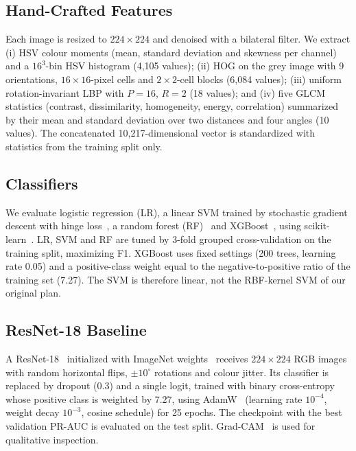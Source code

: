 \documentclass[conference]{IEEEtran}
\begin{document}
\subsection{Hand-Crafted Features}
Each image is resized to $224\times224$ and denoised with a bilateral filter. We extract (i) HSV colour moments (mean, standard deviation and skewness per channel) and a $16^3$-bin HSV histogram (4,105 values); (ii) HOG on the grey image with 9 orientations, $16\times16$-pixel cells and $2\times2$-cell blocks (6,084 values); (iii) uniform rotation-invariant LBP with $P{=}16$, $R{=}2$ (18 values); and (iv) five GLCM statistics (contrast, dissimilarity, homogeneity, energy, correlation) summarized by their mean and standard deviation over two distances and four angles (10 values). The concatenated 10,217-dimensional vector is standardized with statistics from the training split only.

\subsection{Classifiers}
We evaluate logistic regression (LR), a linear SVM trained by stochastic gradient descent with hinge loss~\cite{cortes1995svm}, a random forest (RF)~\cite{breiman2001random} and XGBoost~\cite{chen2016xgboost}, using scikit-learn~\cite{pedregosa2011scikit}. LR, SVM and RF are tuned by 3-fold grouped cross-validation on the training split, maximizing F1. XGBoost uses fixed settings (200 trees, learning rate 0.05) and a positive-class weight equal to the negative-to-positive ratio of the training set (7.27). The SVM is therefore linear, not the RBF-kernel SVM of our original plan.

\subsection{ResNet-18 Baseline}
A ResNet-18~\cite{he2016resnet} initialized with ImageNet weights~\cite{deng2009imagenet} receives $224\times224$ RGB images with random horizontal flips, $\pm10^\circ$ rotations and colour jitter. Its classifier is replaced by dropout (0.3) and a single logit, trained with binary cross-entropy whose positive class is weighted by 7.27, using AdamW~\cite{loshchilov2019decoupled} (learning rate $10^{-4}$, weight decay $10^{-3}$, cosine schedule) for 25 epochs. The checkpoint with the best validation PR-AUC is evaluated on the test split. Grad-CAM~\cite{selvaraju2017gradcam} is used for qualitative inspection.
\end{document}
